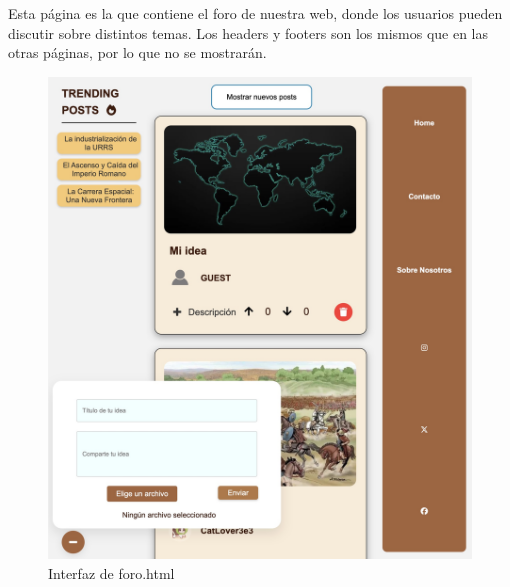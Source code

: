 \documentclass{article}
\begin{document}
Esta página es la que contiene el foro de nuestra web, donde los usuarios pueden discutir sobre distintos temas. Los headers y footers son los mismos que en las otras páginas, por lo que no se mostrarán.


\begin{figure}[H]
    \centering
    \begin{minipage}{0.49\textwidth}
        \includegraphics[width=\linewidth]{htmlFotos/foro.jpg}
        \caption{Interfaz de foro.html}
        \label{fig:foro_interface}
    \end{minipage}\hfill
    \begin{minipage}{0.49\textwidth}

\end{minipage}
\end{figure}
\end{document}
